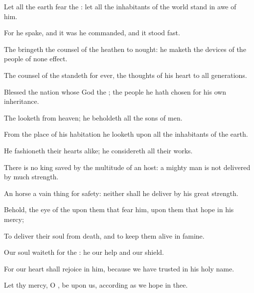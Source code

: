{\par }{\Q {}Let all the
earth
fear the
{}: let all the
inhabitants of the
world stand in
awe of him.


\par }{\Q {}For he
spake, and it was
{} he
commanded, and it stood
fast.


\par }{\Q {}The
{}
bringeth the
counsel of the
heathen to
nought: he
maketh the
devices of the
people of none
effect.


\par }{\Q {}The
counsel of the
{}
standeth for
ever, the
thoughts of his
heart to
all
generations.


\par }{\BB \par }
{\Q {}Blessed
{} the
nation whose
God
{} the
{};
{} the
people
{} he hath
chosen for his own
inheritance.


\par }{\Q {}The
{}
looketh from
heaven; he
beholdeth all the
sons of
men.


\par }{\Q {}From the
place of his
habitation he
looketh upon all the
inhabitants of the
earth.


\par }{\Q {}He
fashioneth their
hearts
alike; he
considereth all their
works.


\par }{\Q {}There is no
king
saved by the
multitude of an
host: a mighty
man is not
delivered by
much
strength.


\par }{\Q {}An
horse
{} a vain
thing for
safety: neither shall he
deliver
{} by his
great
strength.


\par }{\Q {}Behold, the
eye of the
{}
{} upon them that
fear him, upon them that
hope in his
mercy;


\par }{\Q {}To
deliver their
soul from
death, and to keep them
alive in
famine.


\par }{\Q {}Our
soul
waiteth for the
{}: he
{} our
help and our
shield.


\par }{\Q {}For our
heart shall
rejoice in him, because we have
trusted in his
holy
name.


\par }{\Q {}Let thy
mercy, O
{}, be upon us, according as we
hope in thee.




\par }

